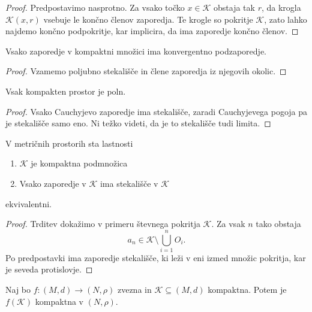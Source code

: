 \documentclass[12pt, a4paper]{article}
\begin{document}
\begin{proof}
Predpostavimo nasprotno. Za vsako točko $x\in\mathcal{K}$ obstaja tak $r$, da krogla $\mathcal{K}(x,r)$ vsebuje le končno členov zaporedja. Te krogle so pokritje $\mathcal{K}$, zato lahko najdemo končno podpokritje, kar implicira, da ima zaporedje končno členov.
\end{proof}

\begin{posledica}
Vsako zaporedje v kompaktni množici ima konvergentno podzaporedje.
\end{posledica}

\begin{proof}
Vzamemo poljubno stekališče in člene zaporedja iz njegovih okolic.
\end{proof}

\begin{posledica}
Vsak kompakten prostor je poln.
\end{posledica}

\begin{proof}
Vsako Cauchyjevo zaporedje ima stekališče, zaradi Cauchyjevega pogoja pa je stekališče samo eno. Ni težko videti, da je to stekališče tudi limita.
\end{proof}

\begin{opomba}
V metričnih prostorih sta lastnosti

\begin{enumerate}[label=\roman*)]
\item $\mathcal{K}$ je kompaktna podmnožica
\item Vsako zaporedje v $\mathcal{K}$ ima stekališče v $\mathcal{K}$
\end{enumerate}

ekvivalentni.
\end{opomba}

\begin{proof}
Trditev dokažimo v primeru števnega pokritja $\mathcal{K}$. Za vsak $n$ tako obstaja
\[
a_n\in\mathcal{K}\setminus\bigcup_{i=1}^nO_i.
\]
Po predpostavki ima zaporedje stekališče, ki leži v eni izmed množic pokritja, kar je seveda protislovje.
\end{proof}

\begin{izrek}
Naj bo $f\colon (M,d)\to(N,\rho)$ zvezna in $\mathcal{K}\subseteq(M,d)$ kompaktna. Potem je $f(\mathcal{K})$ kompaktna v $(N,\rho)$.
\end{izrek}
\end{document}
